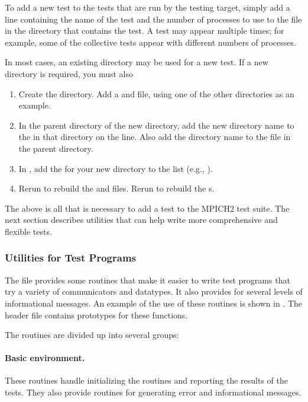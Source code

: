 To add a new test to the tests that are run by the testing target,
simply add a line containing the name of the test and the number of
processes to use to the file  in the directory that
contains the test.  A test may appear multiple times; for example,
some of the collective tests appear with different numbers of
processes.

In most cases, an existing directory may be used for a new test.  If a
new directory is required, you must also 
\begin{enumerate}
\item Create the directory.  Add a  and
 file, using one of the other directories as an
example.
\item In the parent directory of the new directory, add the new
directory name to the  in that directory on the
 line.  Also add the directory name to the
 file in the parent directory.
\item In , add the  for
your new directory to the 
 list (e.g., ).
\item Rerun  to rebuild the 
and  files.  Rerun  to rebuild the
s.  
\end{enumerate}

The above is all that is necessary to add a test to the MPICH2 test
suite.  The next section describes utilities that can help write more
comprehensive and flexible tests.

\subsubsection{Utilities for Test Programs}
\label{sec:test-utilities}
The file  provides some routines that make
it easier to write test programs that try a variety of communicators
and datatypes.  It also provides for several levels of informational
messages.  An example of the use of these routines is shown in
.   The header file
 contains prototypes for these functions.

The routines are divided up into several groups:
\paragraph{Basic environment.}
These routines handle initializing the routines and reporting the
results of the tests.  They also provide routines for generating error
and informational messages.  

